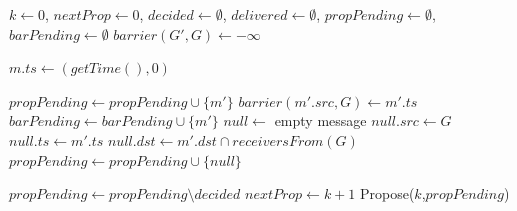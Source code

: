 \documentclass[times, 10pt]{article}
\begin{document}
\begin{algorithm}
\begin{distribalgo}[1]

\blankline
{}
  \STATE $k \leftarrow 0$, $nextProp \leftarrow 0$, $decided \leftarrow \emptyset$, $delivered \leftarrow \emptyset$, $propPending \leftarrow \emptyset$, $barPending \leftarrow \emptyset$
    \STATE $barrier(G',G) \leftarrow -\infty$ 
  \ENDINDENT
\ENDINDENT 

\blankline
{}
  \STATE $m.ts \leftarrow (getTime(),0)$
  \STATE {}
\ENDINDENT

\blankline
{}
    \STATE $propPending \leftarrow propPending \cup \{m'\}$
    \STATE $barrier(m'.src,G) \leftarrow m'.ts$ \label{algline:incbar}
      \STATE $barPending \leftarrow barPending \cup \{m'\}$
    \ENDIF
      \STATE $null \leftarrow$ empty message
      \STATE $null.src \leftarrow G$
      \STATE $null.ts \leftarrow m'.ts$ \label{algline:nulltsmts}
      \STATE $null.dst \leftarrow m'.dst \cap receiversFrom(G)$
      \STATE $propPending \leftarrow propPending \cup \{null\}$
    \ENDIF
  \ENDIF
\ENDINDENT

\blankline
{}
    \STATE $propPending \leftarrow propPending \setminus decided$%
    \label{algline:nullstays}
      \STATE $nextProp \leftarrow k + 1$
      \STATE Propose($k$,$propPending$)
    \ENDIF
\ENDINDENT


\end{distribalgo}
\end{algorithm}
\end{document}
